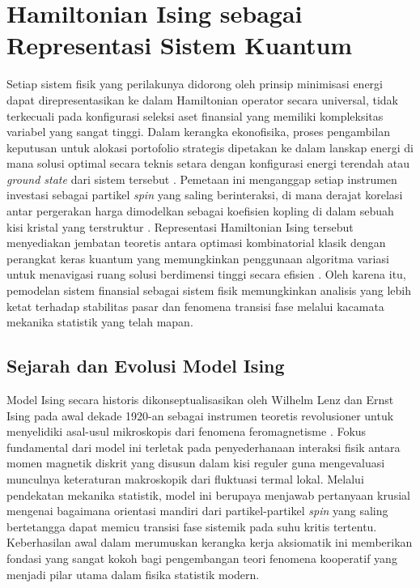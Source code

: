 \section{Hamiltonian Ising sebagai Representasi Sistem Kuantum}
Setiap sistem fisik yang perilakunya didorong oleh prinsip minimisasi energi dapat direpresentasikan ke dalam Hamiltonian operator secara universal, tidak terkecuali pada konfigurasi seleksi aset finansial yang memiliki kompleksitas variabel yang sangat tinggi. Dalam kerangka ekonofisika, proses pengambilan keputusan untuk alokasi portofolio strategis dipetakan ke dalam lanskap energi di mana solusi optimal secara teknis setara dengan konfigurasi energi terendah atau \textit{ground state} dari sistem tersebut \cite{lucas_ising_2014}. Pemetaan ini menganggap setiap instrumen investasi sebagai partikel \textit{spin} yang saling berinteraksi, di mana derajat korelasi antar pergerakan harga dimodelkan sebagai koefisien kopling di dalam sebuah kisi kristal yang terstruktur \cite{galam_ising_2010}. Representasi Hamiltonian Ising tersebut menyediakan jembatan teoretis antara optimasi kombinatorial klasik dengan perangkat keras kuantum yang memungkinkan penggunaan algoritma variasi untuk menavigasi ruang solusi berdimensi tinggi secara efisien \cite{hidalgo_quantum_2006}. Oleh karena itu, pemodelan sistem finansial sebagai sistem fisik memungkinkan analisis yang lebih ketat terhadap stabilitas pasar dan fenomena transisi fase melalui kacamata mekanika statistik yang telah mapan.

\subsection{Sejarah dan Evolusi Model Ising}
Model Ising secara historis dikonseptualisasikan oleh Wilhelm Lenz dan Ernst Ising pada awal dekade 1920-an sebagai instrumen teoretis revolusioner untuk menyelidiki asal-usul mikroskopis dari fenomena feromagnetisme \cite{niss_history_2005}. Fokus fundamental dari model ini terletak pada penyederhanaan interaksi fisik antara momen magnetik diskrit yang disusun dalam kisi reguler guna mengevaluasi munculnya keteraturan makroskopik dari fluktuasi termal lokal. Melalui pendekatan mekanika statistik, model ini berupaya menjawab pertanyaan krusial mengenai bagaimana orientasi mandiri dari partikel-partikel \textit{spin} yang saling bertetangga dapat memicu transisi fase sistemik pada suhu kritis tertentu. Keberhasilan awal dalam merumuskan kerangka kerja aksiomatik ini memberikan fondasi yang sangat kokoh bagi pengembangan teori fenomena kooperatif yang menjadi pilar utama dalam fisika statistik modern.

